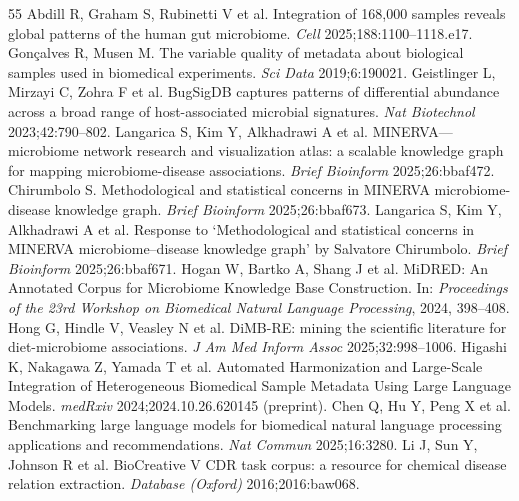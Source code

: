 \documentclass[11pt,a4paper]{article}
\begin{document}
\begin{thebibliography}{55}
%
Abdill R, Graham S, Rubinetti V et al. Integration of 168,000 samples reveals global patterns of the human gut microbiome. \emph{Cell} 2025;188:1100–1118.e17.
Gonçalves R, Musen M. The variable quality of metadata about biological samples used in biomedical experiments. \emph{Sci Data} 2019;6:190021.
Geistlinger L, Mirzayi C, Zohra F et al. BugSigDB captures patterns of differential abundance across a broad range of host-associated microbial signatures. \emph{Nat Biotechnol} 2023;42:790–802.
Langarica S, Kim Y, Alkhadrawi A et al. MINERVA—microbiome network research and visualization atlas: a scalable knowledge graph for mapping microbiome-disease associations. \emph{Brief Bioinform} 2025;26:bbaf472.
Chirumbolo S. Methodological and statistical concerns in MINERVA microbiome-disease knowledge graph. \emph{Brief Bioinform} 2025;26:bbaf673.
Langarica S, Kim Y, Alkhadrawi A et al. Response to ‘Methodological and statistical concerns in MINERVA microbiome–disease knowledge graph’ by Salvatore Chirumbolo. \emph{Brief Bioinform} 2025;26:bbaf671.
Hogan W, Bartko A, Shang J et al. MiDRED: An Annotated Corpus for Microbiome Knowledge Base Construction. In: \emph{Proceedings of the 23rd Workshop on Biomedical Natural Language Processing}, 2024, 398–408.
Hong G, Hindle V, Veasley N et al. DiMB-RE: mining the scientific literature for diet-microbiome associations. \emph{J Am Med Inform Assoc} 2025;32:998–1006.
Higashi K, Nakagawa Z, Yamada T et al. Automated Harmonization and Large-Scale Integration of Heterogeneous Biomedical Sample Metadata Using Large Language Models. \emph{medRxiv} 2024;2024.10.26.620145 (preprint).
Chen Q, Hu Y, Peng X et al. Benchmarking large language models for biomedical natural language processing applications and recommendations. \emph{Nat Commun} 2025;16:3280.
Li J, Sun Y, Johnson R et al. BioCreative V CDR task corpus: a resource for chemical disease relation extraction. \emph{Database (Oxford)} 2016;2016:baw068.

\end{thebibliography}
\end{document}
